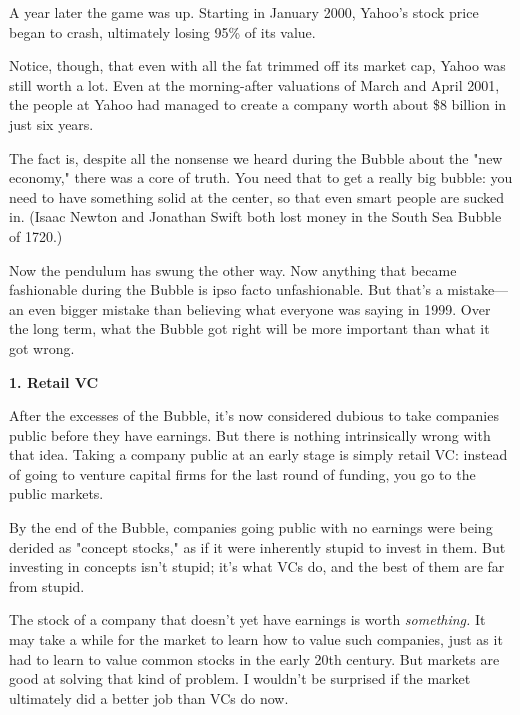A
                  year later the game was up. Starting in January 2000, Yahoo's
                  stock price began to crash, ultimately losing 95\% of its
                  value.

Notice, though, that even with all the fat
                  trimmed off its market cap, Yahoo was still worth a lot. Even
                  at the morning-after valuations of March and April 2001, the
                  people at Yahoo had managed to create a company worth about \$8
                  billion in just six years.

The fact is, despite all
                  the nonsense we heard during the Bubble about the "new
                  economy," there was a core of truth. You need that to get a
                  really big bubble: you need to have something solid at the
                  center, so that even smart people are sucked in. (Isaac Newton
                  and Jonathan Swift both lost money in the South Sea Bubble of
                  1720.)

Now the pendulum has swung the other way.
                  Now anything that became fashionable during the Bubble is ipso
                  facto unfashionable. But that's a mistake---an even bigger
                  mistake than believing what everyone was saying in 1999. Over
                  the long term, what the Bubble got right will be more
                  important than what it got wrong.

\textbf{1. Retail VC}

After the excesses of the Bubble, it's now
                  considered dubious to take companies public before they have
                  earnings. But there is nothing intrinsically wrong with that
                  idea. Taking a company public at an early stage is simply
                  retail VC: instead of going to venture capital firms for the
                  last round of funding, you go to the public markets.

By
                  the end of the Bubble, companies going public with no earnings
                  were being derided as "concept stocks," as if it were
                  inherently stupid to invest in them. But investing in concepts
                  isn't stupid; it's what VCs do, and the best of them are far
                  from stupid.

The stock of a company that doesn't
                  yet have earnings is worth \emph{something.} It may take a
                  while for the market to learn how to value such companies,
                  just as it had to learn to value common stocks in the early
                  20th century. But markets are good at solving that kind of
                  problem. I wouldn't be surprised if the market ultimately did
                  a better job than VCs do now.

